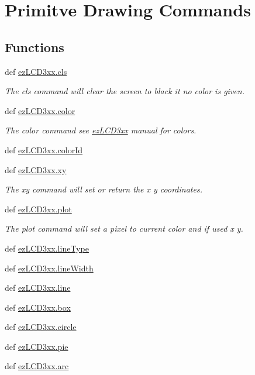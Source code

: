 \hypertarget{group___drawing}{\section{Primitve Drawing Commands}
\label{group___drawing}
}
\subsection*{Functions}
\begin{DoxyCompactItemize}
\item 
def \hyperlink{group___drawing_gacdfb97b09494d0e3cec787014c4863f9}{ez\-L\-C\-D3xx.\-cls}
\begin{DoxyCompactList}\small\item\em The cls command will clear the screen to black it no color is given. \end{DoxyCompactList}\item 
def \hyperlink{group___drawing_ga306a0e99b15bc1122683a1c6e18e7ef0}{ez\-L\-C\-D3xx.\-color}
\begin{DoxyCompactList}\small\item\em The color command see \hyperlink{namespaceez_l_c_d3xx}{ez\-L\-C\-D3xx} manual for colors. \end{DoxyCompactList}\item 
def \hyperlink{group___drawing_ga94dd8d046a01670fc2212b548e29e8d0}{ez\-L\-C\-D3xx.\-color\-Id}
\item 
def \hyperlink{group___drawing_gaf249f02b6ad4e734ffa9d8371f6cab8a}{ez\-L\-C\-D3xx.\-xy}
\begin{DoxyCompactList}\small\item\em The xy command will set or return the x y coordinates. \end{DoxyCompactList}\item 
def \hyperlink{group___drawing_gad3c0ce418a0feea4a0fa40f803c90196}{ez\-L\-C\-D3xx.\-plot}
\begin{DoxyCompactList}\small\item\em The plot command will set a pixel to current color and if used x y. \end{DoxyCompactList}\item 
def \hyperlink{group___drawing_ga9dc821ce2652535899c584d4ff1c1bf7}{ez\-L\-C\-D3xx.\-line\-Type}
\item 
def \hyperlink{group___drawing_ga87b2625e7e4ffa927b4471003f8c6e70}{ez\-L\-C\-D3xx.\-line\-Width}
\item 
def \hyperlink{group___drawing_gae70c22a0a810a70a0dd6d32c9fd7c066}{ez\-L\-C\-D3xx.\-line}
\item 
def \hyperlink{group___drawing_ga63bb01e1f5ef0fe2ae2acec0ed90e5bd}{ez\-L\-C\-D3xx.\-box}
\item 
def \hyperlink{group___drawing_gabfcfb31f2d88c7397332abcc6b324c7c}{ez\-L\-C\-D3xx.\-circle}
\item 
def \hyperlink{group___drawing_ga12fb93d2d6f7ce3f08ad988c09624d57}{ez\-L\-C\-D3xx.\-pie}
\item 
def \hyperlink{group___drawing_ga13a0a8fb9c906a687f2a42864d973cc1}{ez\-L\-C\-D3xx.\-arc}
\end{DoxyCompactItemize}


